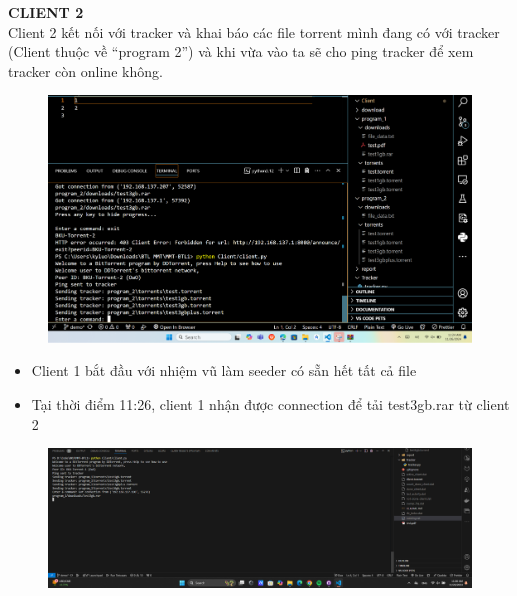 \documentclass[a4paper]{article}
\begin{document}
\noindent \textbf{CLIENT 2}\\
Client 2 kết nối với tracker và khai báo các file torrent mình đang có với tracker (Client thuộc về “program 2”) và khi vừa vào ta sẽ cho ping tracker để xem tracker còn online không.\\
\begin{figure}[H]
    \centering
    \includegraphics[width=1\textwidth]{images/8.png}
    \captionsetup{labelformat=empty}
\end{figure}
\begin{itemize}
    \item Client 1 bắt đầu với nhiệm vũ làm seeder có sẵn hết tất cả file
    \item Tại thời điểm 11:26, client 1 nhận được connection để tải test3gb.rar từ client 2
\end{itemize}
\begin{figure}[H]
    \centering
    \includegraphics[width=1\textwidth]{images/9.png}
    \captionsetup{labelformat=empty}
\end{figure}
\end{document}

